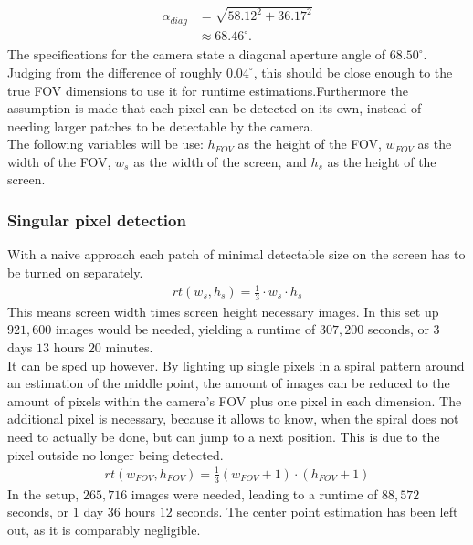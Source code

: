 \documentclass[journal,final,a4paper,twoside]{PS}
\begin{document}
\begin{align}\begin{split}
\alpha_{diag} &= \sqrt{58.12^2 + 36.17^2} \\& \approx 68.46^{\circ}.\end{split}
\end{align}
The specifications for the camera state a diagonal aperture angle of $68.50^{\circ}$. Judging from the difference of roughly $0.04^{\circ}$, this should be close enough to the true FOV dimensions to use it for runtime estimations.Furthermore the assumption is made that each pixel can be detected on its own, instead of needing larger patches to be detectable by the camera.\\
The following variables will be use: $h_{FOV}$ as the height of the FOV, $w_{FOV}$ as the width of the FOV, $w_s$ as the width of the screen, and $h_s$ as the height of the screen.\\
\subsubsection{Singular pixel detection}
\label{singlePixel}
With a naive approach each patch of minimal detectable size on the screen has to be turned on separately.
\begin{align}
rt(w_s, h_s) = \frac{1}{3} \cdot w_s \cdot h_s
\end{align}
This means screen width times screen height necessary images. In this set up $921,600$ images would be needed, yielding a runtime of $307,200$ seconds, or $3$ days $13$ hours $20$ minutes.\\
It can be sped up however. By lighting up single pixels in a spiral pattern around an estimation of the middle point, the amount of images can be reduced to the amount of pixels within the camera’s FOV plus one pixel in each dimension. The additional pixel is necessary, because it allows to know, when the spiral does not need to actually be done, but can jump to a next position. This is due to the pixel outside no longer being detected. \begin{align}
rt(w_{FOV}, h_{FOV}) = \frac{1}{3} (w_{FOV} + 1) \cdot (h_{FOV} + 1)
\end{align}
In the setup, $265,716$ images were needed, leading to a runtime of $88,572$ seconds, or $1$ day $36$ hours $12$ seconds. The center point estimation has been left out, as it is comparably negligible.\\
	
\end{document}
